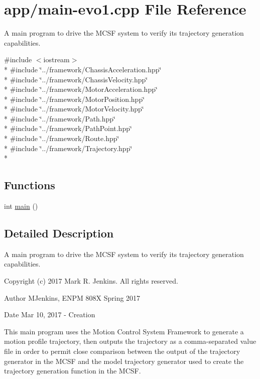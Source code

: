 \hypertarget{main-evo1_8cpp}{\section{app/main-\/evo1.cpp File Reference}
\label{main-evo1_8cpp}
}


A main program to drive the M\-C\-S\-F system to verify its trajectory generation capabilities.  


{\ttfamily \#include $<$iostream$>$}\\*
{\ttfamily \#include \char`\"{}../framework/\-Chassis\-Acceleration.\-hpp\char`\"{}}\\*
{\ttfamily \#include \char`\"{}../framework/\-Chassis\-Velocity.\-hpp\char`\"{}}\\*
{\ttfamily \#include \char`\"{}../framework/\-Motor\-Acceleration.\-hpp\char`\"{}}\\*
{\ttfamily \#include \char`\"{}../framework/\-Motor\-Position.\-hpp\char`\"{}}\\*
{\ttfamily \#include \char`\"{}../framework/\-Motor\-Velocity.\-hpp\char`\"{}}\\*
{\ttfamily \#include \char`\"{}../framework/\-Path.\-hpp\char`\"{}}\\*
{\ttfamily \#include \char`\"{}../framework/\-Path\-Point.\-hpp\char`\"{}}\\*
{\ttfamily \#include \char`\"{}../framework/\-Route.\-hpp\char`\"{}}\\*
{\ttfamily \#include \char`\"{}../framework/\-Trajectory.\-hpp\char`\"{}}\\*
\subsection*{Functions}
\begin{DoxyCompactItemize}
\item 
int \hyperlink{main-evo1_8cpp_ae66f6b31b5ad750f1fe042a706a4e3d4}{main} ()
\end{DoxyCompactItemize}


\subsection{Detailed Description}
A main program to drive the M\-C\-S\-F system to verify its trajectory generation capabilities. \begin{DoxyCopyright}{Copyright}
(c) 2017 Mark R. Jenkins. All rights reserved.
\end{DoxyCopyright}
\begin{DoxyAuthor}{Author}
M\-Jenkins, E\-N\-P\-M 808\-X Spring 2017 
\end{DoxyAuthor}
\begin{DoxyDate}{Date}
Mar 10, 2017 -\/ Creation
\end{DoxyDate}
This main program uses the Motion Control System Framework to generate a motion profile trajectory, then outputs the trajectory as a comma-\/separated value file in order to permit close comparison between the output of the trajectory generator in the M\-C\-S\-F and the model trajectory generator used to create the trajectory generation function in the M\-C\-S\-F. 

